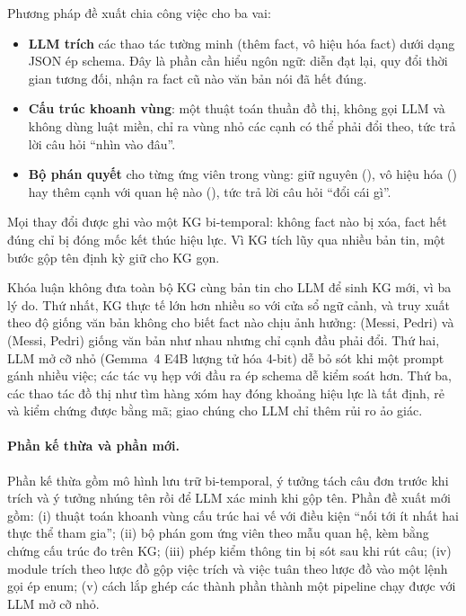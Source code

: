 Phương pháp đề xuất chia công việc cho ba vai:
\begin{itemize}
  \item \textbf{LLM trích} các thao tác tường minh (thêm fact, vô hiệu hóa fact) dưới dạng JSON ép schema. Đây là phần cần hiểu ngôn ngữ: diễn đạt lại, quy đổi thời gian tương đối, nhận ra fact cũ nào văn bản nói đã hết đúng.
  \item \textbf{Cấu trúc khoanh vùng}: một thuật toán thuần đồ thị, không gọi LLM và không dùng luật miền, chỉ ra vùng nhỏ các cạnh có thể phải đổi theo, tức trả lời câu hỏi ``nhìn vào đâu''.
  \item \textbf{Bộ phán quyết} cho từng ứng viên trong vùng: giữ nguyên (), vô hiệu hóa () hay thêm cạnh với quan hệ nào (), tức trả lời câu hỏi ``đổi cái gì''.
\end{itemize}
Mọi thay đổi được ghi vào một KG bi-temporal: không fact nào bị xóa, fact hết đúng chỉ bị đóng mốc kết thúc hiệu lực.
Vì KG tích lũy qua nhiều bản tin, một bước gộp tên định kỳ giữ cho KG gọn.

Khóa luận không đưa toàn bộ KG cùng bản tin cho LLM để sinh KG mới, vì ba lý do.
Thứ nhất, KG thực tế lớn hơn nhiều so với cửa sổ ngữ cảnh, và truy xuất theo độ giống văn bản không cho biết fact nào chịu ảnh hưởng: (Messi, Pedri) và (Messi, Pedri) giống văn bản như nhau nhưng chỉ cạnh đầu phải đổi.
Thứ hai, LLM mở cỡ nhỏ (Gemma~4 E4B lượng tử hóa 4-bit) dễ bỏ sót khi một prompt gánh nhiều việc; các tác vụ hẹp với đầu ra ép schema dễ kiểm soát hơn.
Thứ ba, các thao tác đồ thị như tìm hàng xóm hay đóng khoảng hiệu lực là tất định, rẻ và kiểm chứng được bằng mã; giao chúng cho LLM chỉ thêm rủi ro ảo giác.

\paragraph*{Phần kế thừa và phần mới.}
Phần kế thừa gồm mô hình lưu trữ bi-temporal, ý tưởng tách câu đơn trước khi trích và ý tưởng nhúng tên rồi để LLM xác minh khi gộp tên.
Phần đề xuất mới gồm: (i) thuật toán khoanh vùng cấu trúc hai vế với điều kiện ``nối tới ít nhất hai thực thể tham gia''; (ii) bộ phán gom ứng viên theo mẫu quan hệ, kèm bằng chứng cấu trúc đo trên KG; (iii) phép kiểm thông tin bị sót sau khi rút câu; (iv) module trích theo lược đồ gộp việc trích và việc tuân theo lược đồ vào một lệnh gọi ép enum; (v) cách lắp ghép các thành phần thành một pipeline chạy được với LLM mở cỡ nhỏ.

